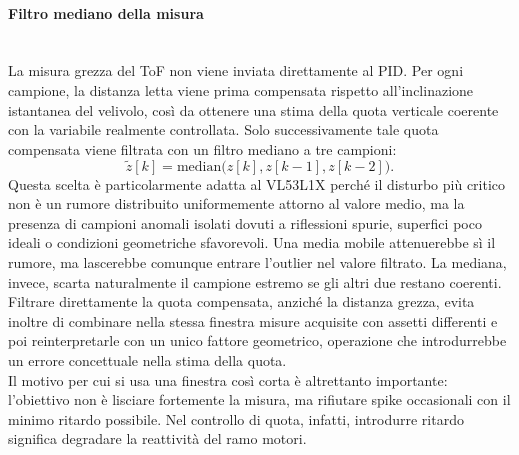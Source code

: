 \documentclass[11pt]{report}
\begin{document}
	\paragraph{Filtro mediano della misura}\mbox{}\\
	La misura grezza del ToF non viene inviata direttamente al PID. Per ogni campione, la distanza letta viene prima compensata rispetto all'inclinazione istantanea del velivolo, così da ottenere una stima della quota verticale coerente con la variabile realmente controllata. Solo successivamente tale quota compensata viene filtrata con un filtro mediano a tre campioni:
	\begin{equation}
		\tilde z[k] = \mathrm{median}\bigl(z[k], z[k-1], z[k-2]\bigr).
	\end{equation}
	Questa scelta è particolarmente adatta al VL53L1X perché il disturbo più critico non è un rumore distribuito uniformemente attorno al valore medio, ma la presenza di campioni anomali isolati dovuti a riflessioni spurie, superfici poco ideali o condizioni geometriche sfavorevoli. Una media mobile attenuerebbe sì il rumore, ma lascerebbe comunque entrare l'outlier nel valore filtrato. La mediana, invece, scarta naturalmente il campione estremo se gli altri due restano coerenti. Filtrare direttamente la quota compensata, anziché la distanza grezza, evita inoltre di combinare nella stessa finestra misure acquisite con assetti differenti e poi reinterpretarle con un unico fattore geometrico, operazione che introdurrebbe un errore concettuale nella stima della quota.\\
	Il motivo per cui si usa una finestra così corta è altrettanto importante: l'obiettivo non è lisciare fortemente la misura, ma rifiutare spike occasionali con il minimo ritardo possibile. Nel controllo di quota, infatti, introdurre ritardo significa degradare la reattività del ramo motori.
	
\end{document}
